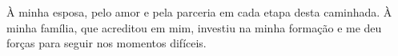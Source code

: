 À minha esposa, pelo amor e pela parceria em cada etapa desta caminhada. À minha família, que acreditou em mim, investiu na minha formação e me deu forças para seguir nos momentos difíceis.
